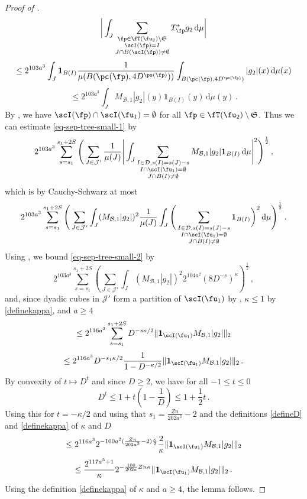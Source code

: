 \begin{proof}[Proof of ]
    $$
        \bigg| \int_J \sum_{\substack{\fp \in \fT(\fu_2) \setminus \mathfrak{S}\\ \scI(\fp) = I\\
        J \cap B(\scI(\fp)) \ne \emptyset}} T_{\fp}^* g_2 \, \mathrm{d}\mu \bigg|
    $$
    $$
        \le 2^{103a^3} \int_J \mathbf{1}_{B(I)} \frac{1}{\mu(B(\pc(\fp), 4D^{\ps(\fp)}))} \int_{B(\pc(\fp), 4D^{\ps(\fp)})} |g_2|(x) \, \mathrm{d}\mu(x)
    $$
    $$
        \le 2^{103a^3} \int_J M_{\mathcal{B},1} |g_2|(y) \mathbf{1}_{B(I)}(y) \, \mathrm{d}\mu(y)\,.
    $$
    By , we have $\scI(\fp) \cap \scI(\fu_1) = \emptyset$ for all $\fp \in \fT(\fu_2) \setminus \mathfrak{S}$.
    Thus we can estimate \eqref{eq-sep-tree-small-1} by
    $$
        2^{103a^3} \sum_{s = s_1}^{s_1 + 2S} \Bigg( \sum_{J \in \mathcal{J}'} \frac{1}{\mu(J)} \Bigg|\int_J \sum_{\substack{I \in \mathcal{D}, s(I) = s(J) - s\\ I \cap \scI(\fu_1) = \emptyset\\
        J \cap B(I) \ne \emptyset}} M_{\mathcal{B},1} |g_2| \mathbf{1}_{B(I)} \, \mathrm{d}\mu \Bigg|^2\Bigg)^{\frac 1 2}\,,
    $$
    which is by Cauchy-Schwarz at most
    \begin{equation}
    \label{eq-sep-tree-small-2}
        2^{103a^3} \sum_{s = s_1}^{s_1 + 2S} \Bigg( \sum_{J \in \mathcal{J}'} \int_J ( M_{\mathcal{B},1} |g_2|)^2 \frac{1}{\mu(J)} \int_J \Bigg(\sum_{\substack{I \in \mathcal{D}, s(I) = s(J) - s\\ I \cap \scI(\fu_1) = \emptyset\\
        J \cap B(I) \ne \emptyset}} \mathbf{1}_{B(I)}\bigg)^2 \, \mathrm{d}\mu \Bigg)^{\frac 12}\,.
    \end{equation}
    Using , we bound \eqref{eq-sep-tree-small-2} by
    $$
        2^{103a^3} \sum_{s = s_1}^{s_1 + 2S} \left(\sum_{J \in \mathcal{J}'} \int_J (M_{\mathcal{B},1} |g_2|)^2 2^{104a^2} (8 D^{-s})^\kappa\right)^{\frac 1 2}\,,
    $$
    and, since dyadic cubes in $\mathcal{J}'$ form a partition of $\scI(\fu_1)$ by , $\kappa \le 1$ by \eqref{definekappa}, and $a \ge 4$
    $$
        \le 2^{116a^3} \sum_{s = s_1}^{s_1 + 2S} D^{-s\kappa/2} \|\mathbf{1}_{\scI(\fu_1)} M_{\mathcal{B},1} |g_2|\|_2
    $$
    $$
        \le 2^{116a^3} D^{-s_1 \kappa /2} \frac{1}{1 - D^{-\kappa/2}} \|\mathbf{1}_{\scI(\fu_1)} M_{\mathcal{B},1} |g_2|\|_2\,.
    $$
    By convexity of $t \mapsto D^t$ and since $D \ge 2$, we have for all $-1 \le t \le 0$
    $$
        D^t \le 1 + t(1 - \frac{1}{D}) \le 1 + \frac{1}{2}t\,.
    $$
    Using this for $t = -\kappa/2$ and using that $s_1 = \frac{Zn}{202a^3} - 2$ and the definitions \eqref{defineD} and \eqref{definekappa} of $\kappa$ and $D$
    $$
        \le 2^{116a^3} 2^{-100a^2(\frac{Zn}{202a^3} - 2) \frac{\kappa}{2}} \frac{2}{\kappa} \|\mathbf{1}_{\scI(\fu_1)} M_{\mathcal{B},1} |g_2|\|_2
    $$
    $$
        \le \frac{2^{117a^3 + 1}}{\kappa} 2^{-\frac{100}{202a}Zn\kappa} \|\mathbf{1}_{\scI(\fu_1)} M_{\mathcal{B},1} |g_2|\|_2\,.
    $$
    Using the definition \eqref{definekappa} of $\kappa$ and $a \ge 4$, the lemma follows.
\end{proof}



